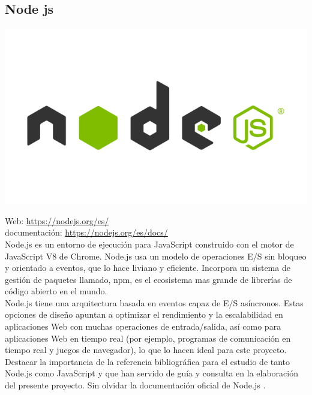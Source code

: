 \subsection{Node js}

\begin{center}
\includegraphics[scale=0.3]{imagenes/nodejs-logo.png}
\end{center}

Web: \url{https://nodejs.org/es/}\\
documentación: \url{https://nodejs.org/es/docs/}\cite{website:4}\\

Node.js es un entorno de ejecución para JavaScript construido con el motor de JavaScript V8 de Chrome. Node.js usa un modelo de operaciones E/S sin bloqueo y orientado a eventos, que lo hace liviano y eficiente. Incorpora un sistema de gestión de paquetes llamado, npm, es el ecosistema mas grande de librerías de código abierto en el mundo.\\

Node.js tiene una arquitectura basada en eventos capaz de E/S asíncronos. Estas opciones de diseño apuntan a optimizar el rendimiento y la escalabilidad en aplicaciones Web con muchas operaciones de entrada/salida, así como para aplicaciones Web en tiempo real (por ejemplo, programas de comunicación en tiempo real y juegos de navegador), lo que lo hacen ideal para este proyecto.\\

Destacar la importancia de la referencia bibliográfica \cite{book:javascript} para el estudio de tanto Node.js como JavaScript y que han servido de guía y consulta en la elaboración del presente proyecto. 
Sin olvidar la documentación oficial de Node.js \cite{website:4}.\\

